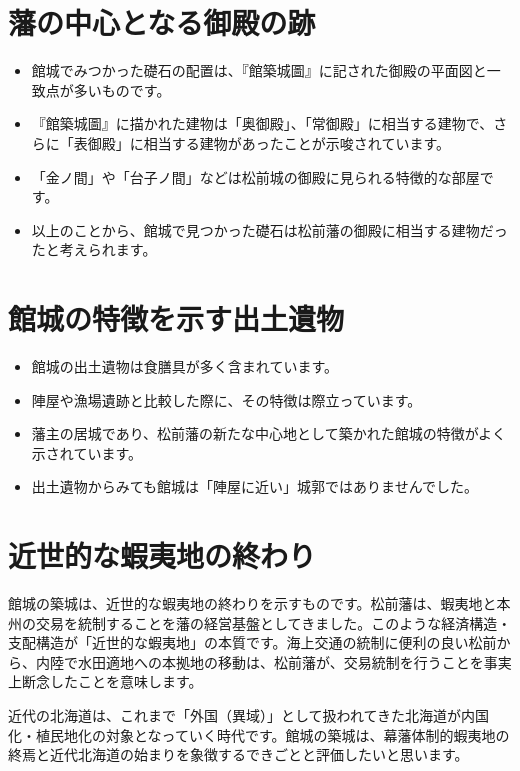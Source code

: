 \documentclass[11pt,report]{jsbook}
\begin{document}
\section{藩の中心となる御殿の跡}
\begin{itemize}
\item 館城でみつかった礎石の配置は、『館築城圖』に記された御殿の平面図と一致点が多いものです。
\item 『館築城圖』に描かれた建物は「奥御殿」、「常御殿」に相当する建物で、さらに「表御殿」に相当する建物があったことが示唆されています。
\item 「金ノ間」や「台子ノ間」などは松前城の御殿に見られる特徴的な部屋です。
\item 以上のことから、館城で見つかった礎石は松前藩の御殿に相当する建物だったと考えられます。
\end{itemize}

\section{館城の特徴を示す出土遺物}
\begin{itemize}
\item 館城の出土遺物は食膳具が多く含まれています。
\item 陣屋や漁場遺跡と比較した際に、その特徴は際立っています。
\item 藩主の居城であり、松前藩の新たな中心地として築かれた館城の特徴がよく示されています。
\item 出土遺物からみても館城は「陣屋に近い」城郭ではありませんでした。
\end{itemize}

\section{近世的な蝦夷地の終わり}
館城の築城は、近世的な蝦夷地の終わりを示すものです。松前藩は、蝦夷地と本州の交易を統制することを藩の経営基盤としてきました。このような経済構造・支配構造が「近世的な蝦夷地」の本質です。海上交通の統制に便利の良い松前から、内陸で水田適地への本拠地の移動は、松前藩が、交易統制を行うことを事実上断念したことを意味します。

近代の北海道は、これまで「外国（異域）」として扱われてきた北海道が内国化・植民地化の対象となっていく時代です。館城の築城は、幕藩体制的蝦夷地の終焉と近代北海道の始まりを象徴するできごとと評価したいと思います。


\newpage
\end{document}
